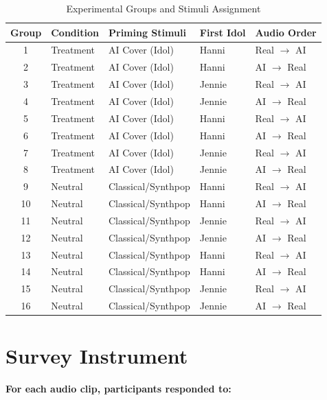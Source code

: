 \documentclass[12pt, a4paper]{article}
\begin{document}
\begin{table}[H]
\centering
\caption{Experimental Groups and Stimuli Assignment}
\begin{tabular}{cllll}
\toprule
Group & Condition & Priming Stimuli & First Idol & Audio Order \\
\midrule
1 & Treatment & AI Cover (Idol) & Hanni & Real $\rightarrow$ AI \\
2 & Treatment & AI Cover (Idol) & Hanni & AI $\rightarrow$ Real \\
3 & Treatment & AI Cover (Idol) & Jennie & Real $\rightarrow$ AI \\
4 & Treatment & AI Cover (Idol) & Jennie & AI $\rightarrow$ Real \\
5 & Treatment & AI Cover (Idol) & Hanni & Real $\rightarrow$ AI \\
6 & Treatment & AI Cover (Idol) & Hanni & AI $\rightarrow$ Real \\
7 & Treatment & AI Cover (Idol) & Jennie & Real $\rightarrow$ AI \\
8 & Treatment & AI Cover (Idol) & Jennie & AI $\rightarrow$ Real \\
\midrule
9 & Neutral & Classical/Synthpop & Hanni & Real $\rightarrow$ AI \\
10 & Neutral & Classical/Synthpop & Hanni & AI $\rightarrow$ Real \\
11 & Neutral & Classical/Synthpop & Jennie & Real $\rightarrow$ AI \\
12 & Neutral & Classical/Synthpop & Jennie & AI $\rightarrow$ Real \\
13 & Neutral & Classical/Synthpop & Hanni & Real $\rightarrow$ AI \\
14 & Neutral & Classical/Synthpop & Hanni & AI $\rightarrow$ Real \\
15 & Neutral & Classical/Synthpop & Jennie & Real $\rightarrow$ AI \\
16 & Neutral & Classical/Synthpop & Jennie & AI $\rightarrow$ Real \\
\bottomrule
\end{tabular}
\end{table}

\section{Survey Instrument}

\textbf{For each audio clip, participants responded to:}
\end{document}
